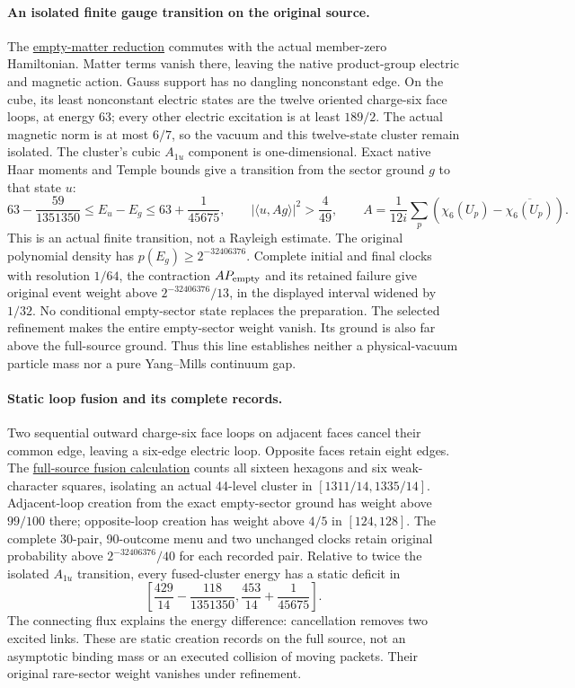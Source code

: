 \paragraph{An isolated finite gauge transition on the original source.}
The \href{https://github.com/FloatingPragma/observer-patch-holography/blob/main/model/particle_primary_reduced_sector/PROOF.md}{empty-matter reduction}
commutes with the actual member-zero Hamiltonian. Matter terms vanish
there, leaving the native product-group electric and magnetic action.
Gauss support has no dangling nonconstant edge. On the cube, its least
nonconstant electric states are the twelve oriented charge-six face
loops, at energy $63$; every other electric excitation is at least
$189/2$. The actual magnetic norm is at most $6/7$, so the vacuum and
this twelve-state cluster remain isolated. The cluster's cubic $A_{1u}$
component is one-dimensional. Exact native Haar moments and Temple
bounds give a transition from the sector ground $g$ to that state $u$:
\[
 63-\frac{59}{1351350}\le E_u-E_g
       \le63+\frac1{45675},\qquad
 |\langle u,Ag\rangle|^2>\frac4{49},\qquad
 A=\frac1{12i}\sum_p(\chi_6(U_p)-\overline{\chi_6(U_p)}).
\]
This is an actual finite transition, not a Rayleigh estimate. The original
polynomial density has $p(E_g)\ge2^{-32406376}$. Complete initial and
final clocks with resolution $1/64$, the contraction $AP_{\rm empty}$
and its retained failure give original event weight above
$2^{-32406376}/13$, in the displayed interval widened by $1/32$.
No conditional empty-sector state replaces the preparation. The selected
refinement makes the entire empty-sector weight vanish. Its ground is
also far above the full-source ground. Thus this line establishes neither
a physical-vacuum particle mass nor a pure Yang--Mills continuum gap.

\paragraph{Static loop fusion and its complete records.}
Two sequential outward charge-six face loops on adjacent faces cancel
their common edge, leaving a six-edge electric loop. Opposite faces
retain eight edges. The \href{https://github.com/FloatingPragma/observer-patch-holography/blob/main/model/particle_primary_loop_fusion/PROOF.md}{full-source fusion calculation}
counts all sixteen hexagons and six weak-character squares, isolating
an actual 44-level cluster in $[1311/14,1335/14]$. Adjacent-loop creation
from the exact empty-sector ground has weight above $99/100$ there;
opposite-loop creation has weight above $4/5$ in $[124,128]$. The
complete 30-pair, 90-outcome menu and two unchanged clocks retain
original probability above $2^{-32406376}/40$ for each recorded pair.
Relative to twice the isolated $A_{1u}$ transition, every fused-cluster
energy has a static deficit in
\[
 \left[\frac{429}{14}-\frac{118}{1351350},
       \frac{453}{14}+\frac1{45675}\right].
\]
The connecting flux explains the energy difference: cancellation removes
two excited links. These are static creation records on the full source,
not an asymptotic binding mass or an executed collision of moving packets.
Their original rare-sector weight vanishes under refinement.

